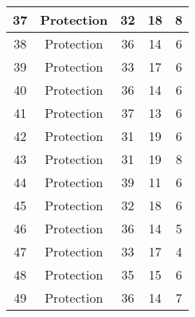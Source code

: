 \documentclass[results.tex]{subfiles}
\begin{document}
\begin{center}
\begin{tabular}{| c || c | c | c | c |}
            \hline
            37                      & Protection                   & 32                     & 18                      & 8                    \\
            \hline
            38                      & Protection                   & 36                     & 14                      & 6                    \\
            \hline
            39                      & Protection                   & 33                     & 17                      & 6                    \\
            \hline
            40                      & Protection                   & 36                     & 14                      & 6                    \\
            \hline
            41                      & Protection                   & 37                     & 13                      & 6                    \\
            \hline
            42                      & Protection                   & 31                     & 19                      & 6                    \\
            \hline
            43                      & Protection                   & 31                     & 19                      & 8                    \\
            \hline
            44                      & Protection                   & 39                     & 11                      & 6                    \\
            \hline
            45                      & Protection                   & 32                     & 18                      & 6                    \\
            \hline
            46                      & Protection                   & 36                     & 14                      & 5                    \\
            \hline
            47                      & Protection                   & 33                     & 17                      & 4                    \\
            \hline
            48                      & Protection                   & 35                     & 15                      & 6                    \\
            \hline
            49                      & Protection                   & 36                     & 14                      & 7                    \\
            \hline
        \end{tabular}
    \end{center}
\end{document}
